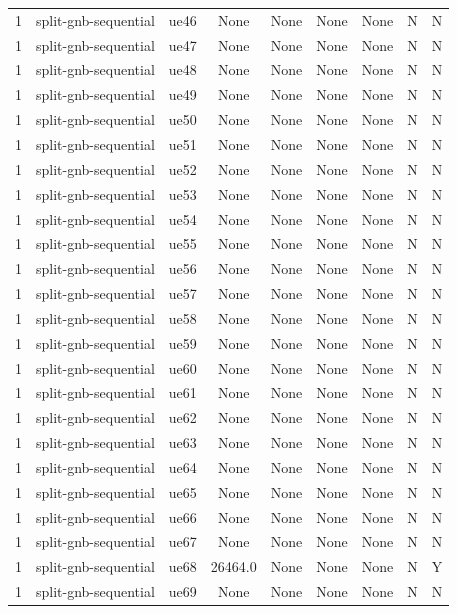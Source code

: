 \begin{table}[ht]
\begin{tabular}{|c|c|c|c|c|c|c|c|c|}
1 & split-gnb-sequential & ue46 & None & None & None & None & N & N \\
1 & split-gnb-sequential & ue47 & None & None & None & None & N & N \\
1 & split-gnb-sequential & ue48 & None & None & None & None & N & N \\
1 & split-gnb-sequential & ue49 & None & None & None & None & N & N \\
1 & split-gnb-sequential & ue50 & None & None & None & None & N & N \\
1 & split-gnb-sequential & ue51 & None & None & None & None & N & N \\
1 & split-gnb-sequential & ue52 & None & None & None & None & N & N \\
1 & split-gnb-sequential & ue53 & None & None & None & None & N & N \\
1 & split-gnb-sequential & ue54 & None & None & None & None & N & N \\
1 & split-gnb-sequential & ue55 & None & None & None & None & N & N \\
1 & split-gnb-sequential & ue56 & None & None & None & None & N & N \\
1 & split-gnb-sequential & ue57 & None & None & None & None & N & N \\
1 & split-gnb-sequential & ue58 & None & None & None & None & N & N \\
1 & split-gnb-sequential & ue59 & None & None & None & None & N & N \\
1 & split-gnb-sequential & ue60 & None & None & None & None & N & N \\
1 & split-gnb-sequential & ue61 & None & None & None & None & N & N \\
1 & split-gnb-sequential & ue62 & None & None & None & None & N & N \\
1 & split-gnb-sequential & ue63 & None & None & None & None & N & N \\
1 & split-gnb-sequential & ue64 & None & None & None & None & N & N \\
1 & split-gnb-sequential & ue65 & None & None & None & None & N & N \\
1 & split-gnb-sequential & ue66 & None & None & None & None & N & N \\
1 & split-gnb-sequential & ue67 & None & None & None & None & N & N \\
1 & split-gnb-sequential & ue68 & 26464.0 & None & None & None & N & Y \\
1 & split-gnb-sequential & ue69 & None & None & None & None & N & N \\

\end{tabular}
\end{table}
